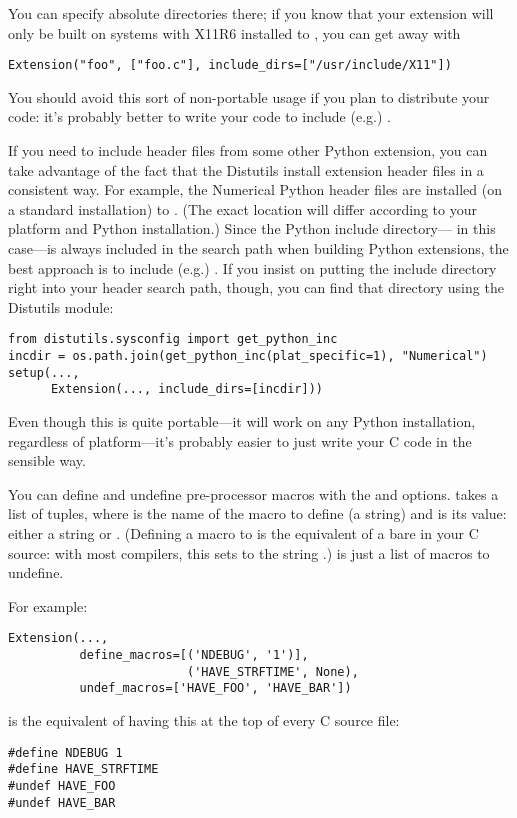 \documentclass{howto}
\begin{document}
You can specify absolute directories there; if you know that your
extension will only be built on \UNIX{} systems with X11R6 installed to
, you can get away with
\begin{verbatim}
Extension("foo", ["foo.c"], include_dirs=["/usr/include/X11"])
\end{verbatim}
You should avoid this sort of non-portable usage if you plan to
distribute your code: it's probably better to write your code to include
(e.g.) .

If you need to include header files from some other Python extension,
you can take advantage of the fact that the Distutils install extension
header files in a consistent way.  For example, the Numerical Python
header files are installed (on a standard \UNIX{} installation) to
.  (The exact location will
differ according to your platform and Python installation.)  Since the
Python include directory--- in this
case---is always included in the search path when building Python
extensions, the best approach is to include (e.g.)
.  If you insist on putting the
 include directory right into your header search path,
though, you can find that directory using the Distutils
 module:
\begin{verbatim}
from distutils.sysconfig import get_python_inc
incdir = os.path.join(get_python_inc(plat_specific=1), "Numerical")
setup(...,
      Extension(..., include_dirs=[incdir]))
\end{verbatim}
Even though this is quite portable---it will work on any Python
installation, regardless of platform---it's probably easier to just
write your C code in the sensible way.

You can define and undefine pre-processor macros with the
 and  options.
 takes a list of  tuples, where
 is the name of the macro to define (a string) and
 is its value: either a string or .  (Defining a
macro  to  is the equivalent of a bare
 in your C source: with most compilers, this sets
 to the string .)   is just
a list of macros to undefine.

For example:
\begin{verbatim}
Extension(...,
          define_macros=[('NDEBUG', '1')],
                         ('HAVE_STRFTIME', None),
          undef_macros=['HAVE_FOO', 'HAVE_BAR'])
\end{verbatim}
is the equivalent of having this at the top of every C source file:
\begin{verbatim}
#define NDEBUG 1
#define HAVE_STRFTIME
#undef HAVE_FOO
#undef HAVE_BAR
\end{verbatim}
\end{document}
